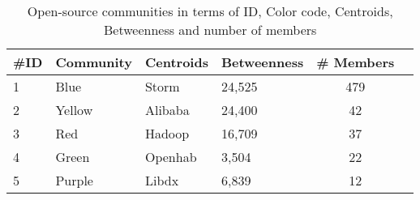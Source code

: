 
\begin{table*}[]
\centering
\caption{Open-source communities in terms of ID, Color code, Centroids, Betweenness and number of members}
\label{tab:communities}
\begin{tabular}{llllcc}
\hline
\#ID               & Community             & Centroids        & Betweenness & \# Members        \\ \hline
1                  & Blue                  & Storm &           24,525 &    479                                      \\ \hline
2                  & Yellow                & Alibaba          & 24,400      & 42                                      \\ \hline
3                  & Red                   & Hadoop           & 16,709      & 37                                      \\ \hline
4                  & Green                 & Openhab          & 3,504       & 22                                      \\ \hline
5                  & Purple                & Libdx              & 6,839       & 12  \\ \hline                                
\end{tabular}
\end{table*}
